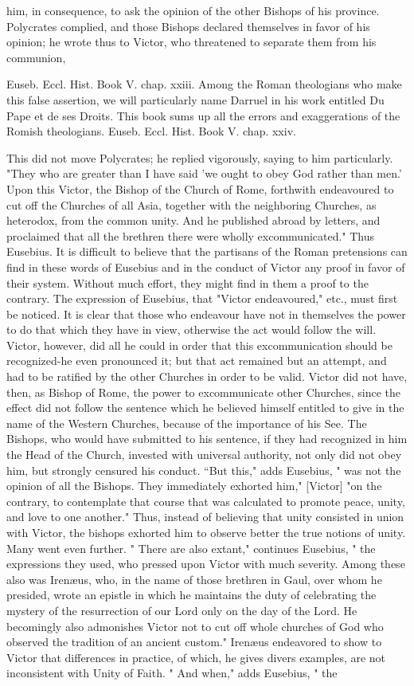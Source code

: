 him, in consequence, to ask the opinion of the other Bishops of his province. Polycrates complied, and those Bishops declared themselves in favor of his opinion; he wrote thus to Victor, who threatened to separate them from his communion,

Euseb. Eccl. Hist. Book V. chap. xxiii. Among the Roman theologians who make this false assertion, we will particularly name Darruel in his work entitled Du Pape et de ses Droits. This book sums up all the errors and exaggerations of the Romish theologians. Euseb. Eccl. Hist. Book V. chap. xxiv.

This did not move Polycrates; he replied vigorously, saying to him particularly. "They who are greater than I have said 'we ought to obey God rather than men.' Upon this Victor, the Bishop of the Church of Rome, forthwith endeavoured to cut off the Churches of all Asia, together with the neighboring Churches, as heterodox, from the common unity. And he published abroad by letters, and proclaimed that all the brethren there were wholly excommunicated." Thus Eusebius. It is difficult to believe that the partisans of the Roman pretensions can find in these words of Eusebius and in the conduct of Victor any proof in favor of their system. Without much effort, they might find in them a proof to the contrary. The expression of Eusebius, that "Victor endeavoured," etc., must first be noticed. It is clear that those who endeavour have not in themselves the power to do that which they have in view, otherwise the act would follow the will. Victor, however, did all he could in order that this excommunication should be recognized-he even pronounced it; but that act remained but an attempt, and had to be ratified by the other Churches in order to be valid. Victor did not have, then, as Bishop of Rome, the power to excommunicate other Churches, since the effect did not follow the sentence which he believed himself entitled to give in the name of the Western Churches, because of the importance of his See. The Bishops, who would have submitted to his sentence, if they had recognized in him the Head of the Church, invested with universal authority, not only did not obey him, but strongly censured his conduct. “But this," adds Eusebius, " was not the opinion of all the Bishops. They immediately exhorted him," [Victor] "on the contrary, to contemplate that course that was calculated to promote peace, unity, and love to one another." Thus, instead of believing that unity consisted in union with Victor, the bishops exhorted him to observe better the true notions of unity. Many went even further. " There are also extant," continues Eusebius, " the expressions they used, who pressed upon Victor with much severity. Among these also was Irenæus, who, in the name of those brethren in Gaul, over whom he presided, wrote an epistle in which he maintains the duty of celebrating the mystery of the resurrection of our Lord only on the day of the Lord. He becomingly also admonishes Victor not to cut off whole churches of God who observed the tradition of an ancient custom." Irenæus endeavored to show to Victor that differences in practice, of which, he gives divers examples, are not inconsistent with Unity of Faith. " And when," adds Eusebius, " the 